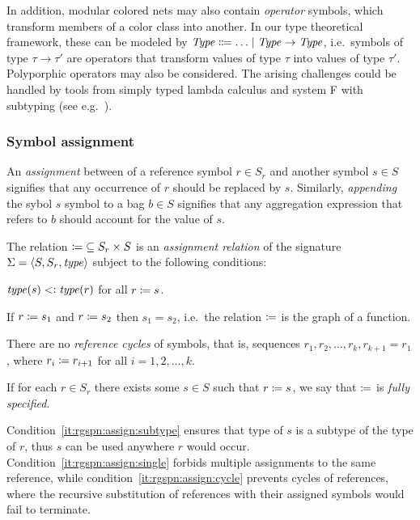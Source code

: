 In addition, modular colored nets may also contain \emph{operator} symbols, which transform members of a color class into another. In our type theoretical framework, these can be modeled by \(\textrm{\itshape Type\/} \Coloneqq \ldots \mid \textrm{\itshape Type\/} \rightarrow \textrm{\itshape Type\/}\), i.e.~symbols of type \(\tau \to \tau'\) are operators that transform values of type \(\tau\) into values of type \(\tau'\). Polyporphic operators may also be considered. The arising challenges could be handled by tools from simply typed lambda calculus and system F with subtyping (see e.g.~\citet[Chapters~15 and~26]{Pierce02tapl}).

\subsubsection{Symbol assignment}

An \emph{assignment} between of a reference symbol \(r \in S_r\) and another symbol \(s \in S\) signifies that any occurrence of \(r\) should be replaced by \(s\). Similarly, \emph{appending} the sybol \(s\) symbol to a bag \(b \in S\) signifies that any aggregation expression that refers to \(b\) should account for the value of \(s\).

\begin{dfn}
  \label{dfn:rgspn:assign}
  The relation \({\coloneq} \subseteq S_r \times S\) is an \emph{ assignment relation} of the signature \(\Sigma = \langle S, S_r, \textrm{\itshape type\/} \rangle\) subject to the following conditions:
  \begin{compactenum}
  \item \(\textrm{\itshape type\/}(s) \mathrel{<\vcentcolon} \textrm{\itshape type\/}(r)\) for all \(r \coloneq s\). \label{it:rgspn:assign:subtype}
  \item If \(r \coloneq s_1\) and \(r \coloneq s_2\) then \(s_1 = s_2\), i.e.~the relation \(\coloneq\) is the graph of a function. \label{it:rgspn:assign:single}
  \item There are no \emph{reference cycles} of symbols, that is, sequences \(r_1, r_2, \ldots, r_k, r_{k + 1} = r_1\), where \(r_i \coloneq r_{i + 1}\) for all \(i = 1, 2, \ldots, k\). \label{it:rgspn:assign:cycle}
  \end{compactenum}
  If for each \(r \in S_r\) there exists some \(s \in S\) such that \(r \coloneq s\), we say that \(\coloneq\) is \emph{fully specified}.
\end{dfn}

Condition~\ref{it:rgspn:assign:subtype} ensures that type of \(s\) is a subtype of the type of \(r\), thus \(s\) can be used anywhere \(r\) would occur. Condition~\ref{it:rgspn:assign:single} forbids multiple assignments to the same reference, while condition~\ref{it:rgspn:assign:cycle} prevents cycles of references, where the recursive substitution of references with their assigned symbols would fail to terminate.

